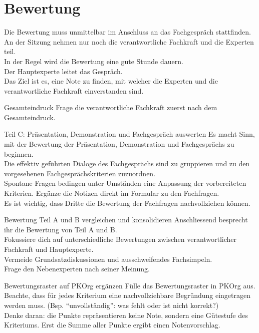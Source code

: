 \section{Bewertung}
Die Bewertung muss unmittelbar im Anschluss an das Fachgespräch stattfinden.\\An der Sitzung nehmen nur noch die verantwortliche Fachkraft und die Experten teil.\\In der Regel wird die Bewertung eine gute Stunde dauern.\\Der Hauptexperte leitet das Gespräch.\\Das Ziel ist es, eine Note zu finden, mit welcher die Experten und die verantwortliche Fachkraft einverstanden sind.

\begin{taskitem}{Gesamteindruck}
  Frage die verantwortliche Fachkraft zuerst nach dem Gesamteindruck.
\end{taskitem}
\begin{taskitem}{Teil C: Präsentation, Demonstration und Fachgespräch auswerten}
  Es macht Sinn, mit der Bewertung der Präsentation, Demonstration und Fachgesprächs zu beginnen.\\Die effektiv geführten Dialoge des Fachgesprächs sind zu gruppieren und zu den vorgesehenen Fachgesprächskriterien zuzuordnen.\\Spontane Fragen bedingen unter Umständen eine Anpassung der vorbereiteten Kriterien. Ergänze die Notizen direkt im Formular zu den Fachfragen.\\Es ist wichtig, dass Dritte die Bewertung der Fachfragen nachvollziehen können.
\end{taskitem}
\newpage
\begin{taskitem}{Bewertung Teil A und B vergleichen und konsolidieren}
  Anschliessend besprecht ihr die Bewertung von Teil A und B.\\Fokussiere dich auf unterschiedliche Bewertungen zwischen verantwortlicher Fachkraft und Hauptexperte.\\Vermeide Grundsatzdiskussionen und ausschweifendes Fachsimpeln.\\Frage den Nebenexperten nach seiner Meinung.
\end{taskitem}
\begin{taskitemwithoutcomment}{Bewertungsraster auf PKOrg ergänzen}
  Fülle das Bewertungsraster in PKOrg aus. Beachte, dass für jedes Kriterium eine nachvollziehbare Begründung eingetragen werden muss. (Bsp. \enquote{unvollständig}: was fehlt oder ist nicht korrekt?)\\Denke daran: die Punkte repräsentieren keine Note, sondern eine Gütestufe des Kriteriums. Erst die Summe aller Punkte ergibt einen Notenvorschlag.
\end{taskitemwithoutcomment}

